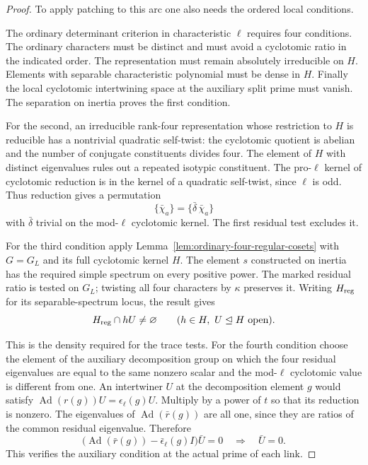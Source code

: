 \begin{proof}

To apply patching to this arc one also needs the ordered local conditions.


The ordinary determinant criterion in characteristic \(\ell\) requires four conditions.
The ordinary characters must be distinct and must avoid a
cyclotomic ratio in the indicated order. The representation
must remain absolutely irreducible on \(H\). Elements with
separable characteristic polynomial must be dense in
\(H\). Finally the local cyclotomic intertwining space at
the auxiliary split prime must vanish. The separation on
inertia proves the first condition.

For the second, an
irreducible rank-four representation whose restriction to
\(H\) is reducible has a nontrivial quadratic self-twist:
the cyclotomic quotient is abelian and the number of
conjugate constituents divides four. The element of \(H\)
with distinct eigenvalues rules out a repeated isotypic
constituent. The pro-\(\ell\) kernel of cyclotomic reduction is
in the kernel of a quadratic self-twist, since \(\ell\) is odd.
Thus reduction gives a permutation
\[
               \{\bar\chi_a\}=\{\bar\delta\,\bar\chi_a\}
\]
with \(\bar\delta\) trivial on the mod-\(\ell\) cyclotomic
kernel. The first residual test excludes it.

For the third condition apply
Lemma~\ref{lem:ordinary-four-regular-cosets} with \(G=G_L\) and its
full cyclotomic kernel \(H\). The element \(s\) constructed on inertia
has the required simple spectrum on every positive power. The marked
residual ratio is tested on \(G_L\); twisting all four characters by
\(\kappa\) preserves it. Writing \(H_{\rm reg}\) for its separable-spectrum locus, the result gives
\[
     H_{\rm reg}\cap hU\ne\varnothing
       \qquad(h\in H,\ U\trianglelefteq H\ \text{open}).
\]

This is the density required for the trace tests. For the fourth condition choose the element
of the auxiliary decomposition group on which the four
residual eigenvalues are equal to the same nonzero scalar
and the mod-\(\ell\) cyclotomic value is different from
one. An intertwiner \(U\) at the decomposition element \(g\)
would satisfy \(\operatorname{Ad}(r(g))U=\epsilon_\ell(g)U\).
Multiply by a power of \(t\) so that its reduction is
nonzero. The eigenvalues of \(\operatorname{Ad}(\bar r(g))\) are all
one, since they are ratios of the common residual eigenvalue.
Therefore
\[
   \bigl(\operatorname{Ad}(\bar r(g))-\bar\epsilon_\ell(g)I\bigr)
        \bar U=0\quad\Longrightarrow\quad\bar U=0.
\] This verifies the auxiliary condition
at the actual prime of each link.


\end{proof}

